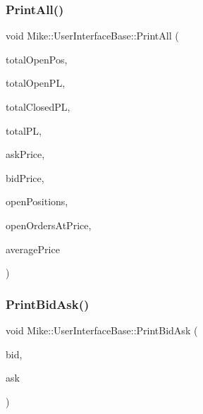 \subsubsection{\texorpdfstring{Print\+All()}{PrintAll()}}
{\footnotesize\ttfamily void Mike\+::\+User\+Interface\+Base\+::\+Print\+All (\begin{DoxyParamCaption}\item[{long}]{total\+Open\+Pos,  }\item[{long}]{total\+Open\+PL,  }\item[{long}]{total\+Closed\+PL,  }\item[{long}]{total\+PL,  }\item[{long}]{ask\+Price,  }\item[{long}]{bid\+Price,  }\item[{const \+::std\+::vector$<$ \hyperlink{class_mike_1_1_mike_position}{Mike\+Position} $>$ $\ast$}]{open\+Positions,  }\item[{const \+::std\+::vector$<$ \hyperlink{class_mike_1_1_mike_orders_at_price}{Mike\+Orders\+At\+Price} $>$ $\ast$}]{open\+Orders\+At\+Price,  }\item[{double}]{average\+Price }\end{DoxyParamCaption})\hspace{0.3cm}{\ttfamily [virtual]}}

\mbox{\label{class_mike_1_1_user_interface_base_a3a1d4bc6ce2f817327d39e48340ae23c}} 
\subsubsection{\texorpdfstring{Print\+Bid\+Ask()}{PrintBidAsk()}}
{\footnotesize\ttfamily void Mike\+::\+User\+Interface\+Base\+::\+Print\+Bid\+Ask (\begin{DoxyParamCaption}\item[{long}]{bid,  }\item[{long}]{ask }\end{DoxyParamCaption})\hspace{0.3cm}{\ttfamily [virtual]}}

\mbox{\label{class_mike_1_1_user_interface_base_a5208d9aa15d5b83eac5aca6e885dd23f}} 
